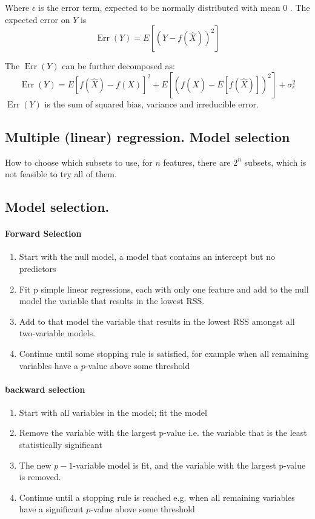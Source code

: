 \documentclass[12pt,a4paper]{article}
\begin{document}
Where $\epsilon$ is the error term, expected to be normally distributed with mean 0 .
The expected error on $Y$ is
\begin{equation*}
\operatorname{Err}(Y)=E\left[(Y-f(\hat{X}))^2\right]
\end{equation*}

The $\operatorname{Err}(Y)$ can be further decomposed as:
\begin{equation*}
\operatorname{Err}(Y)=E[f(\hat{X})-f(X)]^2+E\left[(f(\hat{X})-E[f(\hat{X})])^2\right]+\sigma_\epsilon^2
\end{equation*}
$\operatorname{Err}(Y)$ is the sum of squared bias, variance and irreducible error.

\subsection{Multiple (linear) regression. Model selection}
How to choose which subsets to use, for $n$ features, there are $2^n$ subsets, which is not feasible to try all of them.
\subsection{Model selection.}
\paragraph{Forward Selection}
\begin{enumerate}
    \item Start with the null model, a model that contains an intercept but no predictors
    \item Fit p simple linear regressions, each with only one feature and add to the null model the variable that results in the lowest RSS.
    \item Add to that model the variable that results in the lowest RSS amongst all two-variable models.
    \item Continue until some stopping rule is satisfied, for example when all remaining variables have a $p$-value above some threshold
\end{enumerate}

\paragraph{backward selection}

\begin{enumerate}
    \item Start with all variables in the model; fit the model
    \item Remove the variable with the largest p-value i.e. the variable that is the least statistically significant
    \item The new $p-1$-variable model is fit, and the variable with the largest p-value is removed.
    \item  Continue until a stopping rule is reached e.g. when all remaining variables have a significant $p$-value above some threshold
\end{enumerate}
\end{document}
